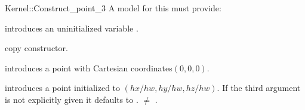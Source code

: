 \begin{ccRefFunctionObjectConcept}{Kernel::Construct_point_3}
A model for this must provide:


\ccHidden {}
             {introduces an uninitialized variable .}

\ccHidden {}
 	    {copy constructor.}

 	    {introduces a point with Cartesian coordinates$(0,0,0)$.}

            {introduces a point  initialized to $(hx/hw,hy/hw, hz/hw)$.
             If the third argument is not explicitly given it defaults
             to .
	     \ccPrecond {} $\neq$ . }

\end{ccRefFunctionObjectConcept}
